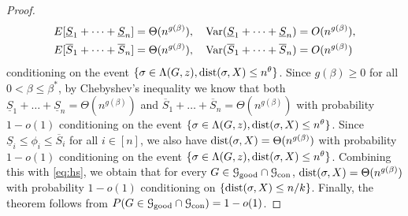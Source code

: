 \documentclass{article}
\begin{document}
\begin{proof}
	\begin{align*}
	& E[\underline{S}_1 + \dots + \underline{S}_n] = \Theta(n^{g(\beta)}) , \quad
	\operatorname{Var}(\underline{S}_1 + \dots + \underline{S}_n) = O(n^{g(\beta)}) , \\
	& E[\overline{S}_1 + \dots + \overline{S}_n] = \Theta(n^{g(\beta)}) , \quad
	\operatorname{Var}(\overline{S}_1 + \dots + \overline{S}_n) = O(n^{g(\beta)}) 
	\end{align*}
	conditioning on the event $\{\sigma\in \Lambda(G,z) ,\operatorname{dist}(\sigma, X) \le n^{\theta}\}$. Since $g(\beta)\ge 0$ for all $0<\beta\le \beta^\ast$, by Chebyshev's inequality we know that both $\underline{S}_1 + \dots + \underline{S}_n=\Theta(n^{g(\beta)})$ and $\overline{S}_1 + \dots + \overline{S}_n=\Theta(n^{g(\beta)})$ with probability $1-o(1)$ conditioning on the event $\{\sigma\in \Lambda(G,z) ,\operatorname{dist}(\sigma, X) \le n^{\theta}\}$.
	Since $\underline{S}_i\le \phi_i\le \overline{S}_i$ for all $i\in[n]$, we also have $\operatorname{dist}(\sigma,X)=\Theta(n^{g(\beta)})$ with probability $1-o(1)$ conditioning on the event $\{\sigma\in \Lambda(G,z) ,\operatorname{dist}(\sigma, X) \le n^{\theta}\}$. Combining this with \eqref{eq:hs}, we obtain that for every $G\in\mathcal{G}_{\operatorname{good}}\cap\mathcal{G}_{\operatorname{con}}$, $\operatorname{dist}(\sigma,X)=\Theta(n^{g(\beta)})$ with probability $1-o(1)$ conditioning on $\{\operatorname{dist}(\sigma, X) \le n/k\}$. Finally, the theorem follows from $P(G\in\mathcal{G}_{\operatorname{good}}\cap\mathcal{G}_{\operatorname{con}})=1-o(1)$.
	

\end{proof}
\end{document}
